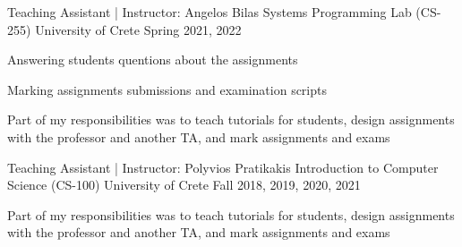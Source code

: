 


\begin{cventries}

  \cventry
    {Teaching Assistant | Instructor: Angelos Bilas} %
    {Systems Programming Lab (CS-255)} %
    {University of Crete} %
    {Spring 2021, 2022} %
    {
      \begin{cvitems} %
        \item{Answering students quentions about the assignments}
        \item{Marking assignments submissions and examination scripts}
        \item{Part of my responsibilities was to teach tutorials for
            students, design assignments with the professor and
              another TA, and mark assignments and exams}
      \end{cvitems}
    }

  \cventry
    {Teaching Assistant | Instructor: Polyvios Pratikakis} %
    {Introduction to Computer Science (CS-100)} %
    {University of Crete} %
    {Fall 2018, 2019, 2020, 2021} %
    {
      \begin{cvitems} %
        \item{Part of my responsibilities was to teach tutorials for
            students, design assignments with the professor and
              another TA, and mark assignments and exams}
      \end{cvitems}
    }


\end{cventries}
